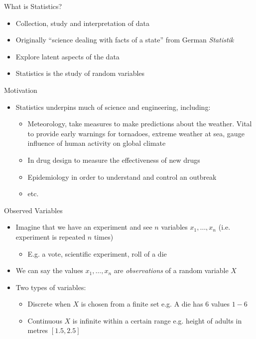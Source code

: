 \documentclass{beamer}
\begin{document}
\begin{frame}{What is Statistics?}  
 \begin{itemize} 
\item Collection, study and interpretation of data 
\item Originally ``science dealing with facts of a state'' from German \emph{Statistik}
\item Explore latent aspects of the data 
\item Statistics is the study of random variables  
 \end{itemize}
\end{frame}

\begin{frame}{Motivation} 
\begin{itemize} 
 \item Statistics underpins much of science and engineering, including: 
\begin{itemize} 
\item Meteorology, take measures to make predictions about the weather. Vital to provide early warnings for tornadoes, extreme weather at sea, gauge influence of human activity on global climate 
\item In drug design to measure the effectiveness of new drugs 
\item Epidemiology in order to understand and control an outbreak 
\item etc. 
\end{itemize} 
\end{itemize}
\end{frame}

\begin{frame}{Observed Variables}
\begin{itemize} 
 \item Imagine that we have an experiment and see $n$ variables $x_1, \ldots, x_n$ (i.e. experiment is repeated $n$ times)
\begin{itemize} 
\item E.g. a vote, scientific experiment, roll of a die
\end{itemize}
\item We can say the values $x_1, \ldots, x_n$ are \emph{observations} of a random variable $X$ 
\item Two types of variables: 
\begin{itemize} 
 \item Discrete when $X$ is chosen from a finite set e.g. A die has 6 values $1-6$ 
\item Continuous $X$ is infinite within a certain range e.g. height of adults in metres $[1.5, 2.5]$
\end{itemize}
\end{itemize}
\end{frame}
\end{document}
